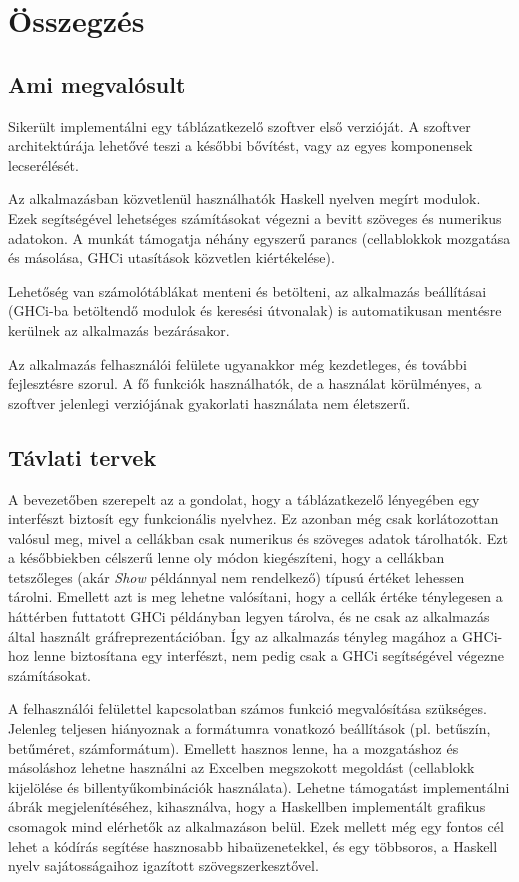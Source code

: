 \chapter{Összegzés} %
\label{ch:sum}

\section{Ami megvalósult}

Sikerült implementálni egy táblázatkezelő szoftver első verzióját. A szoftver architektúrája lehetővé teszi a későbbi bővítést, vagy az egyes komponensek lecserélését. 

Az alkalmazásban közvetlenül használhatók Haskell nyelven megírt modulok. Ezek segítségével lehetséges számításokat végezni a bevitt szöveges és numerikus adatokon. A munkát támogatja néhány egyszerű parancs (cellablokkok mozgatása és másolása, GHCi utasítások közvetlen kiértékelése). 

Lehetőség van számolótáblákat menteni és betölteni, az alkalmazás beállításai (GHCi-ba betöltendő modulok és keresési útvonalak) is automatikusan mentésre kerülnek az alkalmazás bezárásakor.

Az alkalmazás felhasználói felülete ugyanakkor még kezdetleges, és további fejlesztésre szorul. A fő funkciók használhatók, de a használat körülményes, a szoftver jelenlegi verziójának gyakorlati használata nem életszerű.

\section{Távlati tervek}

A bevezetőben szerepelt az a gondolat, hogy a táblázatkezelő lényegében egy interfészt biztosít egy funkcionális nyelvhez. Ez azonban még csak korlátozottan valósul meg, mivel a cellákban csak numerikus és szöveges adatok tárolhatók. Ezt a későbbiekben célszerű lenne oly módon kiegészíteni, hogy a cellákban tetszőleges (akár \textit{Show} példánnyal nem rendelkező) típusú értéket lehessen tárolni. Emellett azt is meg lehetne valósítani, hogy a cellák értéke ténylegesen a háttérben futtatott GHCi példányban legyen tárolva, és ne csak az alkalmazás által használt gráfreprezentációban. Így az alkalmazás tényleg magához a GHCi-hoz lenne biztosítana egy interfészt, nem pedig csak a GHCi segítségével végezne számításokat.

A felhasználói felülettel kapcsolatban számos funkció megvalósítása szükséges. Jelenleg teljesen hiányoznak a formátumra vonatkozó beállítások (pl. betűszín, betűméret, számformátum). Emellett hasznos lenne, ha a mozgatáshoz és másoláshoz lehetne használni az Excelben megszokott megoldást (cellablokk kijelölése és billentyűkombinációk használata). Lehetne támogatást implementálni ábrák megjelenítéséhez, kihasználva, hogy a Haskellben implementált grafikus csomagok mind elérhetők az alkalmazáson belül. Ezek mellett még egy fontos cél lehet a kódírás segítése hasznosabb hibaüzenetekkel, és egy többsoros, a Haskell nyelv sajátosságaihoz igazított szövegszerkesztővel. 

